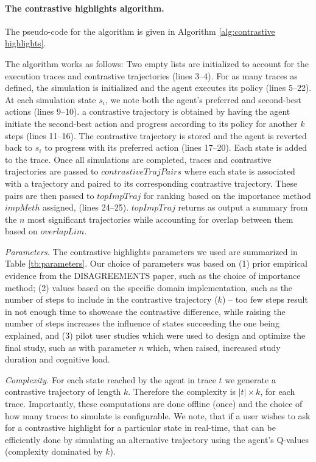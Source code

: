 \documentclass{ecai}
\begin{document}
\paragraph{The contrastive highlights algorithm.} 
The pseudo-code for the algorithm is given in Algorithm \ref{alg:contrastive highlights}.

The algorithm works as follows:
Two empty lists are initialized to account for the execution traces and contrastive trajectories (lines 3--4). For as many traces as defined, the simulation is initialized and the agent executes its policy (lines 5--22). At each simulation state $s_i$, we note both the agent's preferred and second-best actions (lines 9--10). a contrastive trajectory is obtained by having the agent initiate the second-best action and progress according to its policy for another $k$ steps (lines 11--16). The contrastive trajectory is stored and the agent is reverted back to $s_i$ to progress with its preferred action (lines 17--20). Each state is added to the trace. 
Once all simulations are completed, traces and contrastive trajectories are passed to $contrastiveTrajPairs$ where each state is associated with a trajectory and paired to its corresponding contrastive trajectory. These pairs are then passed to $topImpTraj$ for ranking based on the importance method $impMeth$ assigned, (lines 24--25). $topImpTraj$ returns as output a summary from the $n$ most significant trajectories while accounting for overlap between them based on $overlapLim$. 

\emph{Parameters.} The contrastive highlights parameters we used are summarized in Table \ref{tb:parameters}. Our choice of parameters was based on (1) prior empirical evidence from the DISAGREEMENTS paper, such as the choice of importance method; (2) values based on the specific domain implementation, such as the number of steps to include in the contrastive trajectory ($k$) -- too few steps result in not enough time to showcase the contrastive difference, while raising the number of steps increases the influence of states succeeding the one being explained, and (3) pilot user studies which were used to design and optimize the final study, such as with parameter $n$ which, when raised, increased study duration and cognitive load. 

\emph{Complexity.} For each state reached by the agent in trace $t$ we generate a contrastive trajectory of length $k$. Therefore the complexity is $|t| \times k$, for each trace. Importantly, these computations are done offline (once) and the choice of how many traces to simulate is configurable. We note, that if a user wishes to ask for a contrastive highlight for a particular state in real-time, that can be efficiently done by simulating an alternative trajectory using the agent's Q-values (complexity dominated by $k$).
\end{document}
